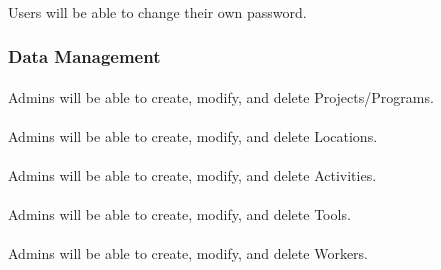\documentclass[12pt]{article}
\begin{document}
\paragraph{} Users will be able to change their own password.


\subsubsection{Data Management}\label{sec:Data Management}
\paragraph{} Admins will be able to create, modify, and delete Projects/Programs.
\paragraph{} Admins will be able to create, modify, and delete Locations.
\paragraph{} Admins will be able to create, modify, and delete Activities.
\paragraph{} Admins will be able to create, modify, and delete Tools.
\paragraph{} Admins will be able to create, modify, and delete Workers.
\end{document}
